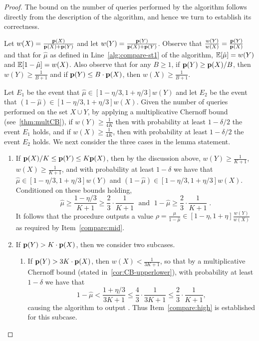 \begin{proof}
The bound on the number of queries performed by the
algorithm follows directly from the description of the algorithm,
and hence we turn to establish its correctness.

Let $w(X) = \frac{\mathbf{p}(X)}{\mathbf{p}(X) +\mathbf{p}(Y)}$ and let
$w(Y) = \frac{\mathbf{p}(Y)}{\mathbf{p}(X) +\mathbf{p}(Y)}$.
Observe that $\frac{w(Y)}{w(X)} = \frac{\mathbf{p}(Y)}{\mathbf{p}(X)}$
and that for $\hat{\mu}$ as defined in Line~\ref{alg:compare-st1} of the
algorithm, $\mathbb{E}\!\left[\hat{\mu}\right]=w(Y)$ and $\mathbb{E}\!\left[1-\hat{\mu}\right] = w(X)$.
Also observe that for any $B \geq 1$,
if $\mathbf{p}(Y) \geq \mathbf{p}(X)/B$,
then $w(Y) \geq \frac{1}{B+1}$ and
if $\mathbf{p}(Y) \leq B\cdot\mathbf{p}(X)$, then
$w(X) \geq \frac{1}{B+1}$.

Let $E_1$ be the event that $\hat{\mu} \in [1-\eta/3,1+\eta/3]w(Y)$
and let $E_2$ be the event that
$(1-\hat{\mu}) \in [1-\eta/3,1+\eta/3]w(X)$.
Given the number of \COND queries
performed on the set $X\cup Y$,
by applying a multiplicative Chernoff bound (see~\cref{thm:multCB}), if
$w(Y) \geq \frac{1}{4K}$ then with probability
at least $1-\delta/2$ the event $E_1$ holds, and if
$w(X) \geq \frac{1}{4K}$, then with probability
at least $1-\delta/2$ the event $E_2$ holds.
We next consider the three cases in the lemma statement.
\begin{enumerate}
\item If $\mathbf{p}(X)/K \leq \mathbf{p}(Y) \leq K \mathbf{p}(X)$, then
by the discussion above, $w(Y) \geq \frac{1}{K+1}$,
$w(X) \geq \frac{1}{K+1}$, and
with probability at least $1-\delta$ we have
that $\hat{\mu} \in [1-\eta/3,1+\eta/3]w(Y)$ and
$(1-\hat{\mu}) \in [1-\eta/3,1+\eta/3]w(X)$.
Conditioned on these bounds holding,
$$\hat{\mu} \geq \frac{1-\eta/3}{K+1} \geq \frac{2}{3}\cdot \frac{1}{K+1}\;
\mbox{ and } \;1-\hat{\mu} \geq \frac{2}{3}\cdot \frac{1}{K+1}\;.$$
It
follows that the procedure outputs a value $\rho = \frac{\hat{\mu}}{1-\hat{\mu}}
\in [1-\eta,1+\eta]\frac{w(Y)}{w(X)}$
as required by Item~\ref{compare:mid}.
\item If $\mathbf{p}(Y) > K\cdot\mathbf{p}(X)$, then we consider two subcases.
  \begin{enumerate}
  \item If $\mathbf{p}(Y) > 3K\cdot\mathbf{p}(X)$, then $w(X) < \frac{1}{3K+1}$,
  so that by a multiplicative Chernoff bound
  (stated in~\cref{cor:CB-upperlower}), with probability
  at least $1-\delta$ we have that
  $$1-\hat{\mu} < \frac{1+\eta/3}{3K+1} \leq \frac{4}{3}\cdot\frac{1}{3K+1}
     \leq \frac{2}{3}\cdot\frac{1}{K+1}, $$
     causing the algorithm to output \high. Thus Item~\ref{compare:high}
     is established for this subcase.

\end{enumerate}
\end{enumerate}
\end{proof}
